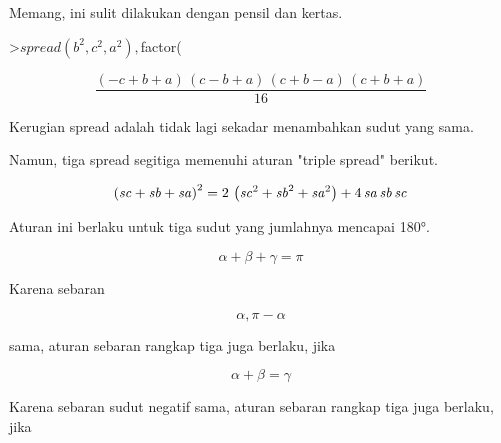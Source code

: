 \documentclass[a4paper,10pt]{article}
\begin{document}
\begin{eulernotebook}
\begin{eulercomment}
\begin{eulercomment}
\begin{eulercomment}
\begin{eulercomment}
\begin{eulercomment}
\begin{eulercomment}
\begin{eulercomment}
\begin{eulercomment}
\begin{eulercomment}
\begin{eulercomment}
\begin{eulercomment}
\begin{eulercomment}
\begin{eulercomment}
\begin{eulercomment}
\begin{eulercomment}
\begin{eulercomment}
\begin{eulercomment}
\begin{eulercomment}
\begin{eulercomment}
Memang, ini sulit dilakukan dengan pensil dan kertas.
\end{eulercomment}
\begin{eulerprompt}
>$spread(b^2,c^2,a^2), $factor(%
\end{eulerprompt}
\begin{eulerformula}
\[
\frac{\left(-c+b+a\right)\,\left(c-b+a\right)\,\left(c+b-a\right)\,  \left(c+b+a\right)}{16}
\]
\end{eulerformula}
\begin{eulercomment}
Kerugian spread adalah tidak lagi sekadar menambahkan sudut yang sama.

Namun, tiga spread segitiga memenuhi aturan "triple spread" berikut.
\end{eulercomment}
\begin{eulerformula}
\[
\left({\it sc}+{\it sb}+{\it sa}\right)^2=2\,\left({\it sc}^2+  {\it sb}^2+{\it sa}^2\right)+4\,{\it sa}\,{\it sb}\,{\it sc}
\]
\end{eulerformula}
\begin{eulercomment}
Aturan ini berlaku untuk tiga sudut yang jumlahnya mencapai 180°.

\end{eulercomment}
\begin{eulerformula}
\[
\alpha+\beta+\gamma=\pi
\]
\end{eulerformula}
\begin{eulercomment}
Karena sebaran

\end{eulercomment}
\begin{eulerformula}
\[
\alpha, \pi-\alpha
\]
\end{eulerformula}
\begin{eulercomment}
sama, aturan sebaran rangkap tiga juga berlaku, jika

\end{eulercomment}
\begin{eulerformula}
\[
\alpha+\beta=\gamma
\]
\end{eulerformula}
\begin{eulercomment}
Karena sebaran sudut negatif sama, aturan sebaran rangkap tiga juga
berlaku, jika


\end{eulercomment}
\end{eulercomment}
\end{eulercomment}
\end{eulercomment}
\end{eulercomment}
\end{eulercomment}
\end{eulercomment}
\end{eulercomment}
\end{eulercomment}
\end{eulercomment}
\end{eulercomment}
\end{eulercomment}
\end{eulercomment}
\end{eulercomment}
\end{eulercomment}
\end{eulercomment}
\end{eulercomment}
\end{eulercomment}
\end{eulercomment}
\end{eulernotebook}
\end{document}
